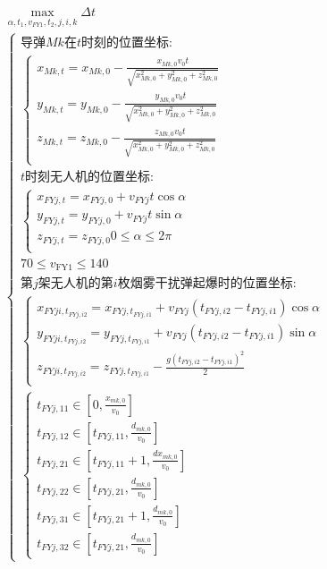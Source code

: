 \documentclass[../main.tex]{subfiles}
\begin{document}
\begin{align}
  \begin{array}{c}
	   \underset{\alpha ,t_1,v_{FY1},t_2,j,i,k}{\max}\Delta t  \\
\left\{ \begin{array}{l}
\text{导弹$Mk$在$t$时刻的位置坐标:}\\
	\left\{ \begin{array}{l}
	x_{Mk,t}=x_{Mk,0}-\frac{x_{Mk,0}v_0t}{\sqrt{x_{Mk,0}^{2}+y_{Mk,0}^{2}+z_{Mk,0}^{2}}}\\
	y_{Mk,t}=y_{Mk,0}-\frac{y_{Mk,0}v_0t}{\sqrt{x_{Mk,0}^{2}+y_{Mk,0}^{2}+z_{Mk,0}^{2}}}\\
	z_{Mk,t}=z_{Mk,0}-\frac{z_{Mk,0}v_0t}{\sqrt{x_{Mk,0}^{2}+y_{Mk,0}^{2}+z_{Mk,0}^{2}}}\\
\end{array} \right. \\
	t\text{时刻无人机的位置坐标:}\\
	\begin{cases}
x_{FYj,t} = x_{FYj,0} + v_{FYj} t \cos\alpha \\
y_{FYj,t} = y_{FYj,0} + v_{FYj} t \sin\alpha \\
z_{FYj,t} = z_{FYj,0}
	0\leq \alpha \leq 2\pi\\
\end{cases}\\
  70 \leq v_{\text{FY1}} \leq 140\\
	\text{第$j$架无人机的第$i$枚烟雾干扰弹起爆时的位置坐标:}\\
	\left\{ \begin{array}{l}
	x_{FYji,t_{FYj,i2}}=x_{FYj,t_{FYj,i1}}+v_{FYj}\left( t_{FYj,i2}-t_{FYj,i1} \right) \cos \alpha\\
	y_{FYji,t_{FYj,i2}}=y_{FYj,t_{FYj,i1}}+v_{FYj}\left( t_{FYj,i2}-t_{FYj,i1} \right) \sin \alpha\\
	z_{FYji,t_{FYj,i2}}=z_{FYj,t_{FYj,i1}}-\frac{g\left( t_{FYj,i2}-t_{FYj,i1} \right) ^2}{2}\\
\end{array} \right.  \\
	\left\{ \begin{array}{l}
	t_{FYj,11}\in \left[ 0, \frac{x_{mk,0}}{v_0} \right]
	\\
	t_{FYj,12}\in \left[ t_{FYj,11}, \frac{d_{mk,0}}{v_0} \right]
	\\
	t_{FYj,21}\in \left[ t_{FYj,11}+1, \frac{dx_{mk,0}}{v_0} \right]
	\\
	t_{FYj,22}\in \left[ t_{FYj,21}, \frac{d_{mk,0}}{v_0} \right]
	\\
	t_{FYj,31}\in \left[ t_{FYj,21}+1, \frac{d_{mk,0}}{v_0} \right]
	\\
	t_{FYj,32}\in \left[ t_{FYj,21}, \frac{d_{mk,0}}{v_0} \right]
\end{array} \right. 
\end{array} \right.  
\end{array}
\end{align}
\end{document}
